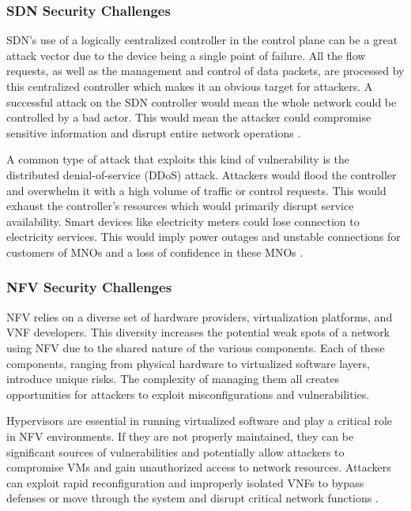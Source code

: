 \documentclass[acmtog]{acmart}
\begin{document}
\subsubsection{SDN Security Challenges}
SDN’s use of a logically centralized controller in the control plane can be a great attack vector due to the device being a single point of failure. All the flow requests, as well as the management and control of data packets, are processed by this centralized controller which makes it an obvious target for attackers. A successful attack on the SDN controller would mean the whole network could be controlled by a bad actor. This would mean the attacker could compromise sensitive information and disrupt entire network operations \cite{ref6}.

A common type of attack that exploits this kind of vulnerability is the distributed denial-of-service (DDoS) attack. Attackers would flood the controller and overwhelm it with a high volume of traffic or control requests. This would exhaust the controller's resources which would primarily disrupt service availability. Smart devices like electricity meters could lose connection to electricity services. This would imply power outages and unstable connections for customers of MNOs and a loss of confidence in these MNOs \cite{ref3}.

\subsubsection{NFV Security Challenges}
NFV relies on a diverse set of hardware providers, virtualization platforms, and VNF developers. This diversity increases the potential weak spots of a network using NFV due to the shared nature of the various components. Each of these components, ranging from physical hardware to virtualized software layers, introduce unique risks. The complexity of managing them all creates opportunities for attackers to exploit misconfigurations and vulnerabilities. 

Hypervisors are essential in running virtualized software and play a critical role in NFV environments. If they are not properly maintained, they can be significant sources of vulnerabilities and potentially allow attackers to compromise VMs and gain unauthorized access to network resources. Attackers can exploit rapid reconfiguration and improperly isolated VNFs to bypass defenses or move through the system and disrupt critical network functions \cite{ref3_1}.
\end{document}

